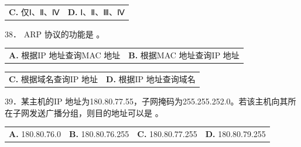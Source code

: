\documentclass[UTF8,11pt]{ctexart}
\begin{document}
\begin{center}\begin{tabular}{>{\raggedright\arraybackslash}p{\dimexpr(\linewidth-4\tabcolsep)/2\relax}>{\raggedright\arraybackslash}p{\dimexpr(\linewidth-4\tabcolsep)/2\relax}}
\textbf{C.} 仅Ⅰ、Ⅱ、Ⅳ & \textbf{D.} Ⅰ、Ⅱ、Ⅲ、Ⅳ\\[.35em]\end{tabular}\end{center}

38． ARP 协议的功能是 。


\begin{center}\begin{tabular}{>{\raggedright\arraybackslash}p{\dimexpr(\linewidth-4\tabcolsep)/2\relax}>{\raggedright\arraybackslash}p{\dimexpr(\linewidth-4\tabcolsep)/2\relax}}
\textbf{A.} 根据IP 地址查询MAC 地址 & \textbf{B.} 根据MAC 地址查询IP 地址\\[.35em]\end{tabular}\end{center}

\begin{center}\begin{tabular}{>{\raggedright\arraybackslash}p{\dimexpr(\linewidth-4\tabcolsep)/2\relax}>{\raggedright\arraybackslash}p{\dimexpr(\linewidth-4\tabcolsep)/2\relax}}
\textbf{C.} 根据域名查询IP 地址 & \textbf{D.} 根据IP 地址查询域名\\[.35em]\end{tabular}\end{center}

39．某主机的IP 地址为180.80.77.55，子网掩码为255.255.252.0。若该主机向其所在子网发送广播分组，则目的地址可以是 。


\begin{center}\begin{tabular}{>{\raggedright\arraybackslash}p{\dimexpr(\linewidth-8\tabcolsep)/4\relax}>{\raggedright\arraybackslash}p{\dimexpr(\linewidth-8\tabcolsep)/4\relax}>{\raggedright\arraybackslash}p{\dimexpr(\linewidth-8\tabcolsep)/4\relax}>{\raggedright\arraybackslash}p{\dimexpr(\linewidth-8\tabcolsep)/4\relax}}
\textbf{A.} 180.\allowbreak{}80.\allowbreak{}76.\allowbreak{}0 & \textbf{B.} 180.\allowbreak{}80.\allowbreak{}76.\allowbreak{}255 & \textbf{C.} 180.\allowbreak{}80.\allowbreak{}77.\allowbreak{}255 & \textbf{D.} 180.\allowbreak{}80.\allowbreak{}79.\allowbreak{}255\\[.35em]\end{tabular}\end{center}
\end{document}

